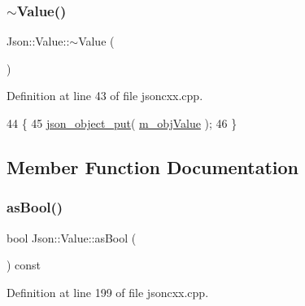 \subsubsection{\texorpdfstring{$\sim$\+Value()}{~Value()}}
{\footnotesize\ttfamily Json\+::\+Value\+::$\sim$\+Value (\begin{DoxyParamCaption}{ }\end{DoxyParamCaption})}



Definition at line 43 of file jsoncxx.\+cpp.


\begin{DoxyCode}
44     \{
45         \hyperlink{json__object_8c_a24340b9a57fb8c4df72915d001437202}{json\_object\_put}( \hyperlink{class_json_1_1_value_a3a705e06c2dbc4a6e142b58b0cbca57e}{m\_objValue} );
46     \}
\end{DoxyCode}


\subsection{Member Function Documentation}
\mbox{\label{class_json_1_1_value_ab693fb7b9b1595bb0adc49658bbf780d}} 
\subsubsection{\texorpdfstring{as\+Bool()}{asBool()}}
{\footnotesize\ttfamily bool Json\+::\+Value\+::as\+Bool (\begin{DoxyParamCaption}{ }\end{DoxyParamCaption}) const}



Definition at line 199 of file jsoncxx.\+cpp.


